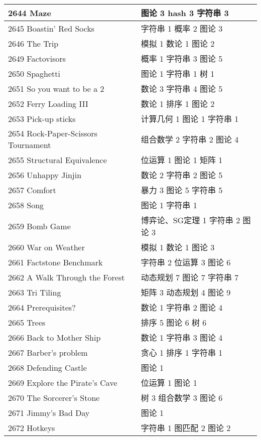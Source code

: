 \begin{longtable}{| p{} | p{} |}
 2644 Maze  & 图论 3 hash 3 字符串 3 \\ \hline
 2645 Boastin' Red Socks  & 字符串 1 概率 2 图论 3 \\ \hline
 2646 The Trip  & 模拟 1 数论 1 图论 2 \\ \hline
 2649 Factovisors  & 概率 1 字符串 3 图论 5 \\ \hline
 2650 Spaghetti  & 图论 1 字符串 1 树 1 \\ \hline
 2651 So you want to be a 2  & 数论 3 字符串 4 图论 5 \\ \hline
 2652 Ferry Loading III  & 数论 1 排序 1 图论 2 \\ \hline
 2653 Pick-up sticks  & 计算几何 1 图论 1 字符串 1 \\ \hline
 2654 Rock-Paper-Scissors Tournament  & 组合数学 2 字符串 2 图论 4 \\ \hline
 2655 Structural Equivalence  & 位运算 1 图论 1 矩阵 1 \\ \hline
 2656 Unhappy Jinjin  & 数论 2 字符串 2 图论 5 \\ \hline
 2657 Comfort  & 暴力 3 图论 5 字符串 5 \\ \hline
 2658 Song  & 图论 1 字符串 1 \\ \hline
 2659 Bomb Game  & 博弈论、SG定理 1 字符串 2 图论 3 \\ \hline
 2660 War on Weather  & 模拟 1 数论 1 图论 3 \\ \hline
 2661 Factstone Benchmark  & 字符串 2 位运算 3 图论 6 \\ \hline
 2662 A Walk Through the Forest  & 动态规划 7 图论 7 字符串 7 \\ \hline
 2663 Tri Tiling  & 矩阵 3 动态规划 4 图论 9 \\ \hline
 2664 Prerequisites?  & 数论 1 字符串 2 图论 4 \\ \hline
 2665 Trees  & 排序 5 图论 6 树 6 \\ \hline
 2666 Back to Mother Ship  & 数论 1 字符串 3 图论 4 \\ \hline
 2667 Barber's problem  & 贪心 1 排序 1 字符串 1 \\ \hline
 2668 Defending Castle  & 图论 1 \\ \hline
 2669 Explore the Pirate's Cave  & 位运算 1 图论 1 \\ \hline
 2670 The Sorcerer's Stone  & 树 3 组合数学 3 图论 6 \\ \hline
 2671 Jimmy's Bad Day  & 图论 1 \\ \hline
 2672 Hotkeys  & 字符串 1 图匹配 2 图论 2 \\ \hline

\end{longtable}
